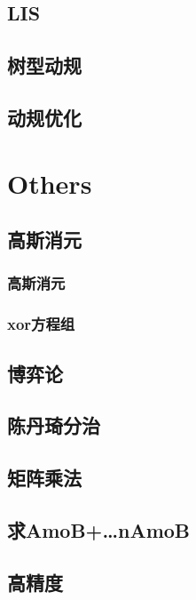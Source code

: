 \documentclass[10pt]{article}
\begin{document}
\subsection{LIS}

\subsection{树型动规}

\subsection{动规优化}


\section{Others}
\subsection{高斯消元}

\subsubsection{高斯消元}
\subsubsection{xor方程组}

\subsection{博弈论}

\subsection{陈丹琦分治}

\subsection{矩阵乘法}

\subsection{求AmoB+…nAmoB}

\subsection{高精度}

\end{document}
